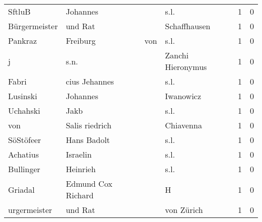 \begin{tabular}{llllrr}
                   SftluB &                           Johannes &             &                                        s.l. &          1 &         0 \\
            Bürgermeister &                            und Rat &             &                                Schaffhausen &          1 &         0 \\
                  Pankraz &                           Freiburg &         von &                                        s.l. &          1 &         0 \\
                        j &                               s.n. &             &                           Zanchi Hieronymus &          1 &         0 \\
                    Fabri &                      cius Jehannes &             &                                        s.l. &          1 &         0 \\
                 Lusinski &                           Johannes &             &                                   Iwanowicz &          1 &         0 \\
                 Uchahski &                               Jakb &             &                                        s.l. &          1 &         0 \\
                      von &                     Salis riedrich &             &                                   Chiavenna &          1 &         0 \\
                SöStöfeer &                        Hans Badolt &             &                                        s.l. &          1 &         0 \\
                 Achatius &                           Israelin &             &                                        s.l. &          1 &         0 \\
                Bullinger &                           Heinrieh &             &                                        s.l. &          1 &         0 \\
                  Griadal &                 Edmund Cox Richard &             &                                           H &          1 &         0 \\
             urgermeister &                            und Rat &             &                                  von Zürich &          1 &         0 \\
\bottomrule
\end{tabular}

